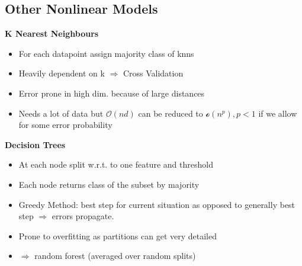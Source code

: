 \subsection{Other Nonlinear Models}

\textbf{K Nearest Neighbours}
\begin{itemize}
    \item For each datapoint assign majority class of knns
    \item Heavily dependent on k $\Rightarrow$ Cross Validation
    \item Error prone in high dim. because of large distances
    \item Needs a lot of data but $\mathcal{O}(nd)$ can be reduced to $\mathcal{o}(n^p),p<1$ if we allow for some error probability
\end{itemize}
\textbf{Decision Trees}
\begin{itemize}
    \item At each node split w.r.t. to one feature and threshold
    \item Each node returns class of the subset by majority
    \item Greedy Method: best step for current situation as opposed to generally best step $\Rightarrow$ errors propagate.
    \item Prone to overfitting as partitions can get very detailed
    \item $\Rightarrow$ random forest (averaged over random splits)
\end{itemize}


